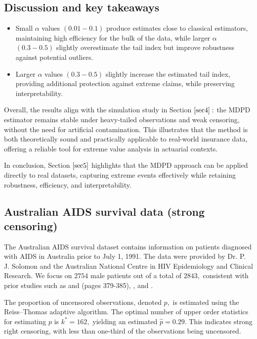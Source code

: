 \documentclass[reqno,openbib,runningheads,a4paper,12pt]{amsart}%
\begin{document}
\subsection{Discussion and key takeaways}

\begin{itemize}
\item Small $\alpha$ values $(0.01-0.1)$ produce estimates close to classical
estimators, maintaining high efficiency for the bulk of the data, while larger
$\alpha$ $(0.3-0.5)$ slightly overestimate the tail index but improve
robustness against potential outliers.

\item Larger $\alpha$ values $(0.3-0.5)$ slightly increase the estimated tail
index, providing additional protection against extreme claims, while
preserving interpretability.
\end{itemize}

\noindent Overall, the results align with the simulation study in Section
$\ref{sec4}:$ the MDPD estimator remains stable under heavy-tailed
observations and weak censoring, without the need for artificial
contamination. This illustrates that the method is both theoretically sound
and practically applicable to real-world insurance data, offering a reliable
tool for extreme value analysis in actuarial contexts.\medskip

\noindent In conclusion, Section $\ref{sec5}$ highlights that the MDPD
approach can be applied directly to real datasets, capturing extreme events
effectively while retaining robustness, efficiency, and interpretability.

\subsection{Australian AIDS survival data (strong censoring)}

\noindent The Australian AIDS survival dataset contains information on
patients diagnosed with AIDS in Australia prior to July 1, 1991. The data were
provided by Dr. P. J. Solomon and the Australian National Centre in HIV
Epidemiology and Clinical Research. We focus on $2754$ male patients out of a
total of $2843,$ consistent with prior studies such as \cite{RS-94} and
\cite{VR-02} (pages 379-385), \cite{EnFG08}, \cite{Ndao14} and \cite{S-16}%
.\medskip

\noindent The proportion of uncensored observations, denoted $p,$ is estimated
using the Reiss--Thomas adaptive algorithm. The optimal number of upper order
statistics for estimating $p$ is $k^{\ast}=162,$ yielding an estimated
$\widehat{p}=0.29.$ This indicates strong right censoring, with less than
one-third of the observations being uncensored.\medskip
\end{document}
